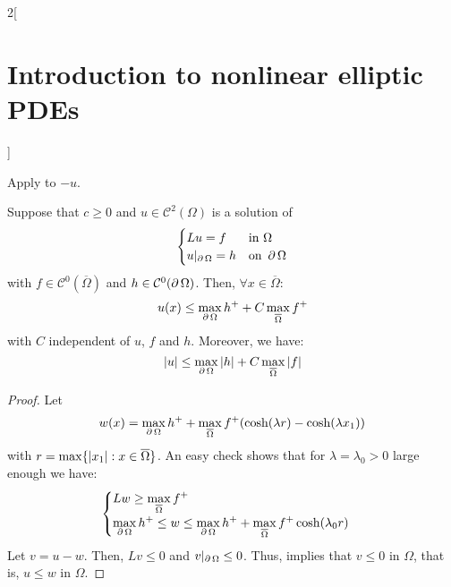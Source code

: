 \documentclass[../../../main_math.tex]{subfiles}
\begin{document}
\begin{multicols}{2}[\section{Introduction to nonlinear elliptic PDEs}]
  \begin{sproof}
    Apply  to $-u$.
  \end{sproof}
  \begin{theorem}\label{INEPDE:apriori}
    Suppose that $c\geq 0$ and $u\in \mathcal{C}^2(\Omega)$ is a solution of
    $$
      \begin{cases}
        Lu=f               & \text{in }\Omega      \\
        u|_{\operatorname{\partial}{\Omega}}=h & \text{on }\operatorname{\partial}{\Omega}
      \end{cases}
    $$
    with $f\in \mathcal{C}^0(\overline{\Omega})$ and $h\in \mathcal{C}^0(\operatorname{\partial}{\Omega})$. Then, $\forall x\in\overline{\Omega}$:
    $$
      u(x)\leq \max_{\operatorname{\partial}{\Omega}}h^++C\max_{\overline{\Omega}}f^+
    $$
    with $C$ independent of $u$, $f$ and $h$. Moreover, we have:
    $$
      \abs{u}\leq \max_{\operatorname{\partial}{\Omega}}\abs{h}+C\max_{\overline{\Omega}}\abs{f}
    $$
  \end{theorem}
  \begin{proof}
    Let $$w(x)=\displaystyle \max_{\operatorname{\partial}{\Omega}}h^++\max_{\overline{\Omega}}f^+(\cosh(\lambda r)-\cosh(\lambda x_1))$$
    with $r=\max\{\abs{x_1}:x\in\overline{\Omega}\}$. An easy check shows that for $\lambda=\lambda_0>0$ large enough we have:
    $$
      \begin{cases}
        Lw \geq \displaystyle\max_{\overline{\Omega}}f^+ \\
        \displaystyle\max_{\operatorname{\partial}{\Omega}}h^+\leq w \leq \displaystyle\max_{\operatorname{\partial}{\Omega}}h^++\max_{\overline{\Omega}}f^+ \cosh(\lambda_0 r)
      \end{cases}
    $$
    Let $v=u-w$. Then, $Lv\leq 0$ and $v|_{\operatorname{\partial}{\Omega}}\leq 0$. Thus,  implies that $v\leq 0$ in $\Omega$, that is, $u\leq w$ in $\Omega$.
  \end{proof}

\end{multicols}
\end{document}
